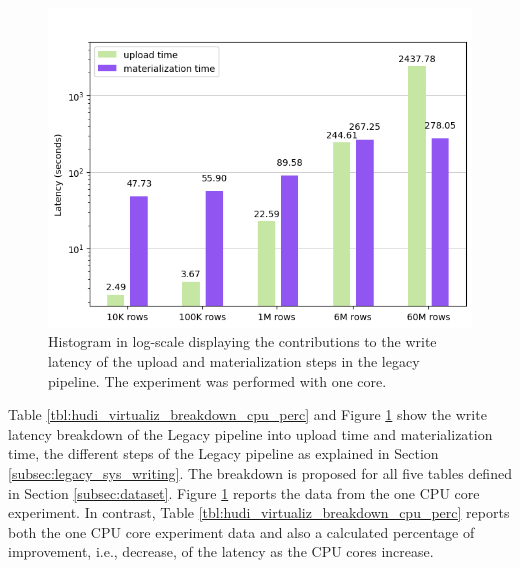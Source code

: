 \begin{figure}
\begin{minipage}[b]{\textwidth}
\begin{tabular}{r S[table-format=4.2] S[table-format=4.2] S[table-format=2.2] S[table-format=2.2] S[table-format=2.2] S[table-format=2.2] S[table-format=2.2] S[table-format=2.2]}
            \bottomrule
        \end{tabular}
    \end{minipage}
    \begin{minipage}[b]{\textwidth}
        \includegraphics[width=\textwidth]{figures/5-results/hudi_virtualiz_1_core.png}
        \caption[Histogram of the write on legacy pipeline - Time breakdown - 1 core]{Histogram in log-scale displaying the contributions to the write latency of the upload and materialization steps in the legacy pipeline. The experiment was performed with one  core.}
        \label{fig:hudi_virtualiz_breakdown}
    \end{minipage}
\end{figure}

Table \ref{tbl:hudi_virtualiz_breakdown_cpu_perc} and Figure \ref{fig:hudi_virtualiz_breakdown} show the write latency breakdown of the Legacy pipeline into upload time and materialization time, the different steps of the Legacy pipeline as explained in Section \ref{subsec:legacy_sys_writing}. The breakdown is proposed for all five tables defined in Section \ref{subsec:dataset}. Figure \ref{fig:hudi_virtualiz_breakdown} reports the data from the one \gls{CPU} core experiment. In contrast, Table \ref{tbl:hudi_virtualiz_breakdown_cpu_perc} reports both the one \gls{CPU} core experiment data and also a calculated percentage of improvement, i.e., decrease, of the latency as the \gls{CPU} cores increase.

